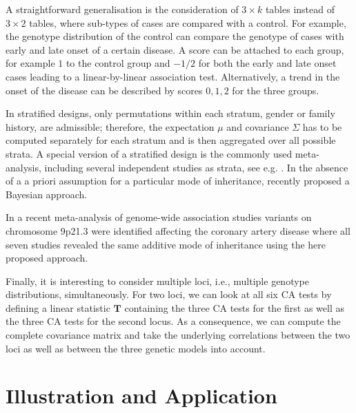 \documentclass[bimj,fleqn]{w-art}
\newcommand{\T}{\mathbf{T}}
\begin{document}
A straightforward generalisation is the consideration of $3 \times k$ tables 
instead of $3 \times 2$ tables, where sub-types of cases are compared 
with a control. For example, the genotype distribution
of the control can compare the genotype
of cases with early and late onset of a certain disease. 
A score can be attached to each group, for example 
$1$ to the control group and $-1/2$ for both the early and late onset
cases leading to a linear-by-linear association test. Alternatively,
a trend in the onset of the disease can be described by scores $0, 1, 2$
for the three groups.

In stratified designs, only permutations within each stratum, gender or
family history, are 
admissible; therefore, the expectation $\mu$ and covariance $\Sigma$ has
to be computed separately for each stratum and is then aggregated
over all possible strata. A special version of a stratified design is the commonly used 
meta-analysis, 
including several independent studies as strata, see e.g. \citet{Kavvoura2008}. 
In the absence of a a priori assumption for a particular mode of inheritance, recently 
 \citet{Salanti2008} proposed a Bayesian approach.
 
 In a recent meta-analysis of genome-wide association studies variants on chromosome 9p21.3 
 were identified affecting the coronary artery disease \citep{Schunkert2008} 
 where all seven studies revealed the same additive mode of inheritance using the here proposed approach.


Finally, it is interesting to consider multiple loci, i.e., 
multiple genotype distributions, simultaneously. For two loci, 
we can look at all six CA tests by defining a linear statistic
$\T$ containing the three CA tests for the first as well 
as the three CA tests for the second locus. As a consequence,
we can compute the complete covariance matrix and take the 
underlying correlations between the two loci as well as between the three genetic models into account.

\section{Illustration and Application}
\end{document}
